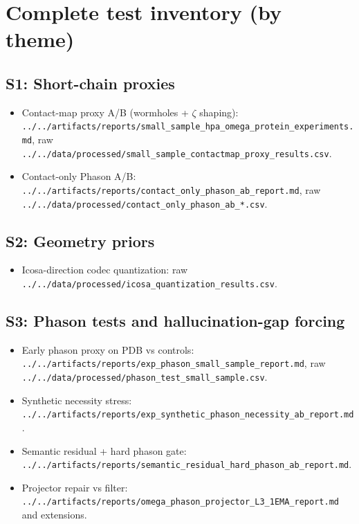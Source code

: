 \documentclass[10pt]{article}
\begin{document}
\section{Complete test inventory (by theme)}

\subsection{S1: Short-chain proxies}
\begin{itemize}[leftmargin=*]
\item Contact-map proxy A/B (wormholes + \(\zeta\) shaping): \texttt{../../artifacts/reports/small\_sample\_hpa\_omega\_protein\_experiments.md}, raw \texttt{../../data/processed/small\_sample\_contactmap\_proxy\_results.csv}.
\item Contact-only Phason A/B: \texttt{../../artifacts/reports/contact\_only\_phason\_ab\_report.md}, raw \texttt{../../data/processed/contact\_only\_phason\_ab\_*.csv}.
\end{itemize}

\subsection{S2: Geometry priors}
\begin{itemize}[leftmargin=*]
\item Icosa-direction codec quantization: raw \texttt{../../data/processed/icosa\_quantization\_results.csv}.
\end{itemize}

\subsection{S3: Phason tests and hallucination-gap forcing}
\begin{itemize}[leftmargin=*]
\item Early phason proxy on PDB vs controls: \texttt{../../artifacts/reports/exp\_phason\_small\_sample\_report.md}, raw \texttt{../../data/processed/phason\_test\_small\_sample.csv}.
\item Synthetic necessity stress: \texttt{../../artifacts/reports/exp\_synthetic\_phason\_necessity\_ab\_report.md}.
\item Semantic residual + hard phason gate: \texttt{../../artifacts/reports/semantic\_residual\_hard\_phason\_ab\_report.md}.
\item Projector repair vs filter: \texttt{../../artifacts/reports/omega\_phason\_projector\_L3\_1EMA\_report.md} and extensions.
\end{itemize}
\end{document}
